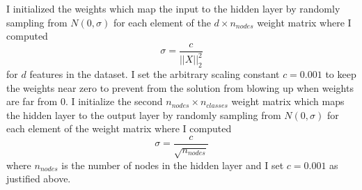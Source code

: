 \documentclass[12pt]{amsart}
\begin{document}
I initialized the weights which map the input to the hidden layer by randomly sampling from $N(0,\sigma)$ for each element of the $d \times n_{nodes}$ weight matrix where I computed 
\begin{equation}
\sigma = \frac{c}{||X||^2_2}
\end{equation}
for $d$ features in the dataset.  I set the arbitrary scaling constant $c = 0.001$ to keep the weights near zero to prevent from the solution from blowing up when weights are far from 0.  I initialize the second $n_{nodes} \times n_{classes}$ weight matrix which maps the hidden layer to the output layer by randomly sampling from $N(0,\sigma)$ for each element of the weight matrix where I computed 
\begin{equation}
\sigma = \frac{c}{\sqrt{n_{nodes}}}
\end{equation}
where $n_{nodes}$ is the number of nodes in the hidden layer and I set $c = 0.001$ as justified above.
\end{document}
